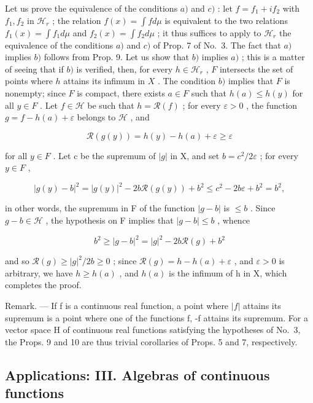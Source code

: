 Let us prove the equivalence of the conditions \(a)\) and \(c)\) : let \(f = f_{1} + if_{2}\) with \(f_{1}, f_{2}\) in \(\mathcal{H}_{r}\) ; the relation \(f(x) = \int f d\mu\) is equivalent to the two relations \(f_{1}(x) = \int f_{1} d\mu\) and \(f_{2}(x) = \int f_{2} d\mu\) ; it thus suffices to apply to \(\mathcal{H}_{r}\) the equivalence of the conditions \(a)\) and \(c)\) of Prop. 7 of No.~3. The fact that \(a)\) implies \(b)\) follows from Prop. 9. Let us show that \(b)\) implies \(a)\) ; this is a matter of seeing that if \(b)\) is verified, then, for every \(h \in \mathcal{H}_{r}\) , \(F\) intersects the set of points where \(h\) attains its infimum in \(X\) . The condition \(b)\) implies that \(F\) is nonempty; since \(F\) is compact, there exists \(a \in F\) such that \(h(a) \leqslant h(y)\) for all \(y \in F\) . Let \(f \in \mathcal{H}\) be such that \(h = \mathcal{R}(f)\) ; for every \(\varepsilon > 0\) , the function \(g = f - h(a) + \varepsilon\) belongs to \(\mathcal{H}\) , and

\[
\mathcal {R} (g (y)) = h (y) - h (a) + \varepsilon \geqslant \varepsilon
\]

for all \(y \in F\) . Let c be the supremum of \(|g|\) in X, and set \(b = c^{2}/2\varepsilon\) ; for every \(y \in F\) ,

\[
\left| g (y) - b \right| ^ {2} = \left| g (y) \right| ^ {2} - 2 b \mathcal {R} (g (y)) + b ^ {2} \leqslant c ^ {2} - 2 b \varepsilon + b ^ {2} = b ^ {2},
\]

in other words, the supremum in F of the function \(|g - b|\) is \(\leqslant b\) . Since \(g - b \in \mathcal{H}\) , the hypothesis on F implies that \(|g - b| \leqslant b\) , whence

\[
b ^ {2} \geqslant | g - b | ^ {2} = | g | ^ {2} - 2 b \mathcal {R} (g) + b ^ {2}
\]

and so \(\mathcal{R}(g) \geqslant |g|^{2}/2b \geqslant 0\) ; since \(\mathcal{R}(g) = h - h(a) + \varepsilon\) , and \(\varepsilon > 0\) is arbitrary, we have \(h \geqslant h(a)\) , and \(h(a)\) is the infimum of h in X, which completes the proof.

Remark. --- If f is a continuous real function, a point where \(|f|\) attains its supremum is a point where one of the functions f, -f attains its supremum. For a vector space H of continuous real functions satisfying the hypotheses of No.~3, the Props. 9 and 10 are thus trivial corollaries of Props. 5 and 7, respectively.

\subsection{Applications: III. Algebras of continuous functions}

